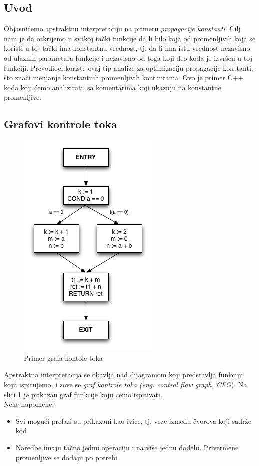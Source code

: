\subsection{Uvod}
\label{subsec:uvod}
Objasnićemo apstraktnu interpretaciju na primeru \emph{propagacije konstanti}. 
Cilj nam je da otkrijemo u svakoj tački funkcije da li bilo koja od promenljivih koja se koristi u toj tački ima konstantnu vrednost, tj. da li ima istu vrednost nezavisno od ulaznih parametara funkcije i nezavisno od toga koji deo koda je izvršen u toj funkciji. 
Prevodioci koriste ovaj tip analize za optimizaciju propagacije konstanti, što znači menjanje konstantnih promenljivih kontantama. 
Ovo je primer C++ koda koji ćemo analizirati, sa komentarima koji ukazuju na konstantne promenljive.


\subsection{Grafovi kontrole toka}
\label{subsec:cfgs}

\begin{figure}
\begin{center}
\includegraphics[scale=0.5]{Treehydra-cfg.png}
\end{center}
\caption{Primer grafa kontole toka}
\label{fig:graf}
\end{figure}

Apstraktna interpretacija se obavlja nad dijagramom koji predstavlja funkciju koju ispitujemo, i zove se \emph{graf kontrole toka (eng. control flow graph, CFG}). Na slici \ref{fig:graf} je prikazan graf funkcije koju ćemo ispitivati. \\
Neke napomene:
\begin{itemize}
\item Svi mogući prelazi su prikazani kao ivice, tj. veze između čvorova koji sadrže kod
\item Naredbe imaju tačno jednu operaciju i najviše jednu dodelu. Privermene promenljive se dodaju po potrebi.
\end{itemize}

